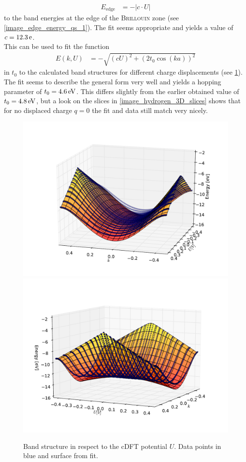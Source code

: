 \begin{align}
	E_\text{edge} &= -\left|c \cdot U\right|
\end{align}
to the band energies at the edge of the \textsc{Brillouin} zone (see \cref{image_edge_energy_qs_1}). The fit seems appropriate and yields a value of $c = \unit[12.3]{e}$.\\
This can be used to fit the function
\begin{align}
	E\left(k, U\right) &= - \sqrt{\left(cU\right)^2 + \left(2t_0\cos(ka)\right)^2}
\end{align}
in $t_0$ to the calculated band structures for different charge displacements (see \cref{image_hydrogen_3D_2}). The fit seems to describe the general form very well and yields a hopping parameter of $t_0 = \unit[4.6]{eV}$. This differs slightly from the earlier obtained value of $t_0 = \unit[4.8]{eV}$, but a look on the slices in \cref{image_hydrogen_3D_slices} shows that for no displaced charge $q = 0$ the fit and data still match very nicely.\\
\begin{figure}[!p]
	\centering
	\includegraphics[width = 13cm]{Images/Hydrogen/charging/3D/figure_1-2}
	\includegraphics[width = 13cm]{Images/Hydrogen/charging/3D/figure_1-1}
	\caption{Band structure in respect to the cDFT potential $U$. Data points in blue and surface from fit.}
	\label{image_hydrogen_3D_2}
\end{figure}
